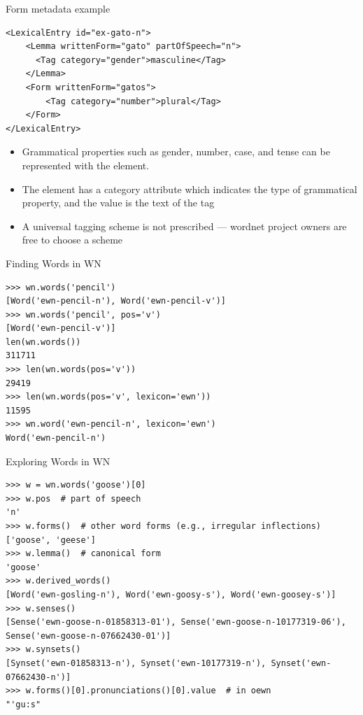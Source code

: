 \documentclass[aspectratio=169]{beamer}
\begin{document}
\begin{frame}[fragile]{Form metadata example}
\begin{verbatim}
<LexicalEntry id="ex-gato-n">
    <Lemma writtenForm="gato" partOfSpeech="n">
      <Tag category="gender">masculine</Tag>
    </Lemma>
    <Form writtenForm="gatos">
        <Tag category="number">plural</Tag>
    </Form>
</LexicalEntry>
\end{verbatim}
  \begin{itemize}
  \item Grammatical properties such as gender, number, case, and tense can be represented with the  element.
  \item The  element has a category attribute which indicates the type of grammatical property, and the value is the text of the tag
  \item  A universal tagging scheme is not prescribed --- wordnet project owners are free to choose a scheme 

\end{itemize}
  
\end{frame}

\begin{frame}[fragile]{Finding Words in WN}
\begin{verbatim}
>>> wn.words('pencil')
[Word('ewn-pencil-n'), Word('ewn-pencil-v')]
>>> wn.words('pencil', pos='v')
[Word('ewn-pencil-v')]
len(wn.words())
311711
>>> len(wn.words(pos='v'))
29419
>>> len(wn.words(pos='v', lexicon='ewn'))
11595
>>> wn.word('ewn-pencil-n', lexicon='ewn')
Word('ewn-pencil-n')
\end{verbatim}
\end{frame}

\begin{frame}[fragile]{Exploring Words in WN}
\begin{verbatim}
>>> w = wn.words('goose')[0]
>>> w.pos  # part of speech
'n'
>>> w.forms()  # other word forms (e.g., irregular inflections)
['goose', 'geese']
>>> w.lemma()  # canonical form
'goose'
>>> w.derived_words()
[Word('ewn-gosling-n'), Word('ewn-goosy-s'), Word('ewn-goosey-s')]
>>> w.senses()
[Sense('ewn-goose-n-01858313-01'), Sense('ewn-goose-n-10177319-06'), Sense('ewn-goose-n-07662430-01')]
>>> w.synsets()
[Synset('ewn-01858313-n'), Synset('ewn-10177319-n'), Synset('ewn-07662430-n')]
>>> w.forms()[0].pronunciations()[0].value  # in oewn 
"'gu:s"
\end{verbatim}
\end{frame}
\end{document}
